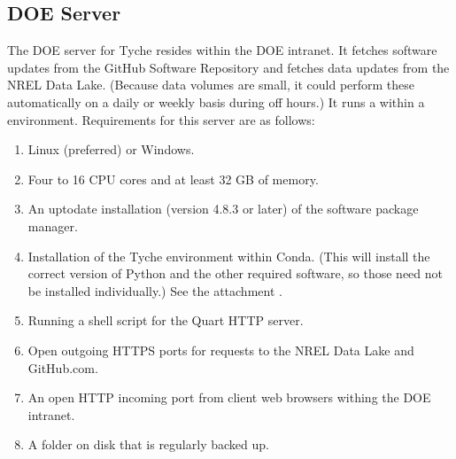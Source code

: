 \documentclass[letterpaper,10pt,english]{sphinxmanual}
\begin{document}
\subsection{DOE Server}
\label{\detokenize{deployment:doe-server}}
\sphinxAtStartPar
The DOE server for Tyche resides within the DOE intranet. It fetches
software updates from the GitHub Software Repository and fetches data
updates from the NREL Data Lake. (Because data volumes are small, it
could perform these automatically on a daily or weekly basis during off
hours.) It runs a  within a
 environment.
Requirements for this server are as follows:
\begin{enumerate}
%
\item {} 
\sphinxAtStartPar
Linux (preferred) or Windows.

\item {} 
\sphinxAtStartPar
Four to 16 CPU cores and at least 32 GB of memory.

\item {} 
\sphinxAtStartPar
An up\sphinxhyphen{}to\sphinxhyphen{}date installation (version 4.8.3 or later) of the
 software
package manager.

\item {} 
\sphinxAtStartPar
Installation of the Tyche environment within Conda. (This will
install the correct version of Python and the other required
software, so those need not be installed individually.) See the
attachment .

\item {} 
\sphinxAtStartPar
Running a shell script for the Quart HTTP server.

\item {} 
\sphinxAtStartPar
Open outgoing HTTPS ports for  requests to the NREL Data Lake
and GitHub.com.

\item {} 
\sphinxAtStartPar
An open HTTP incoming port from client web browsers withing the DOE
intranet.

\item {} 
\sphinxAtStartPar
A folder on disk that is regularly backed up.

\end{enumerate}
\end{document}
